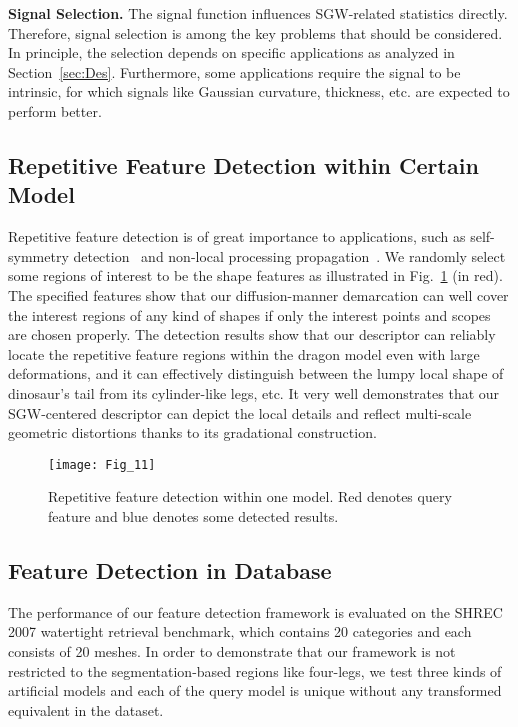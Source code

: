 \textbf{Signal Selection.} The signal function influences SGW-related
statistics directly. Therefore, signal selection is among the key
problems that should be considered. In principle, the selection
depends on specific applications as analyzed in Section~\ref{sec:Des}.
Furthermore, some applications require the signal to be intrinsic, for
which signals like Gaussian curvature, thickness, etc. are expected to
perform better.

\subsection{Repetitive Feature Detection within Certain Model}

Repetitive feature detection is of great importance to applications,
such as self-symmetry detection~\cite{Gal2006} and non-local
processing propagation~\cite{Maximo:2011:RRI:2027471}. We randomly
select some regions of interest to be the shape features as
illustrated in Fig.~\ref{detect_self} (in red). The specified features
show that our diffusion-manner demarcation can well cover the interest
regions of any kind of shapes if only the interest points and scopes
are chosen properly. The detection results show that our descriptor
can reliably locate the repetitive feature regions within the dragon
model even with large deformations, and it can effectively distinguish
between the lumpy local shape of dinosaur's tail from its cylinder-like
legs, etc. It very well demonstrates that our SGW-centered descriptor
can depict the local details and reflect multi-scale geometric
distortions thanks to its gradational construction.

\begin{figure}[!to]
\begin{center}
\texttt{[image: Fig\_11]}
\end{center}
\caption[Repetitive feature detection within one model.]
  {Repetitive feature detection within one model. Red
  denotes query feature and blue denotes some detected
  results.}
\label{detect_self}
\end{figure}

\subsection{Feature Detection in Database}

The performance of our feature detection framework is evaluated on
the SHREC 2007 watertight retrieval benchmark, which contains 20
categories and each consists of 20 meshes. In order to demonstrate
that our framework is not restricted to the segmentation-based regions
like four-legs, we test three kinds of artificial models and each of
the query model is unique without any transformed equivalent in the
dataset.

